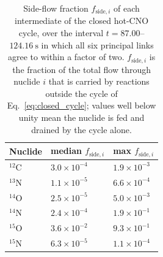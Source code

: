 \begin{table}[h!]
\centering
\caption{Side-flow fraction $f_{\mathrm{side},i}$ of each intermediate of the closed hot-CNO cycle, over the interval $t=87.00$--$124.16\ \mathrm{s}$ in which all six principal links agree to within a factor of two. $f_{\mathrm{side},i}$ is the fraction of the total flow through nuclide $i$ that is carried by reactions outside the cycle of Eq.~\eqref{eq:closed_cycle}; values well below unity mean the nuclide is fed and drained by the cycle alone.}
\begin{tabular}{lll}
\hline
Nuclide & median $f_{\mathrm{side},i}$ & max $f_{\mathrm{side},i}$ \\
\hline
$^{12}\mathrm{C}$ & $3.0\times10^{-4}$ & $1.9\times10^{-3}$ \\
$^{13}\mathrm{N}$ & $1.1\times10^{-5}$ & $6.6\times10^{-4}$ \\
$^{14}\mathrm{O}$ & $2.5\times10^{-5}$ & $5.0\times10^{-3}$ \\
$^{14}\mathrm{N}$ & $2.4\times10^{-4}$ & $1.9\times10^{-1}$ \\
$^{15}\mathrm{O}$ & $3.6\times10^{-2}$ & $9.3\times10^{-1}$ \\
$^{15}\mathrm{N}$ & $6.3\times10^{-5}$ & $1.1\times10^{-4}$ \\
\hline
\end{tabular}
\label{tab:nucnetpy_side_flow}
\end{table}
